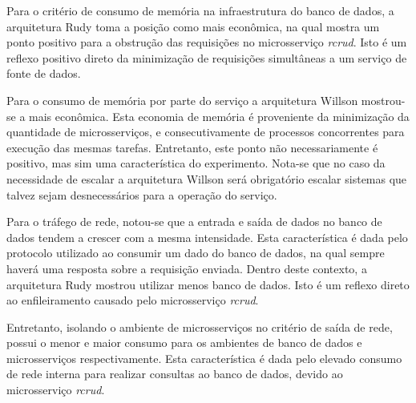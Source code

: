 Para o critério de consumo de memória na infraestrutura do banco de dados, a arquitetura Rudy toma a posição como mais econômica, na qual mostra um ponto positivo para a obstrução das requisições no microsserviço \textit{rcrud}.
%
Isto é um reflexo positivo direto da minimização de requisições simultâneas a um serviço de fonte de dados.


Para o consumo de memória por parte do serviço a arquitetura Willson mostrou-se a mais econômica.
%
Esta economia de memória é proveniente da minimização da quantidade de microsserviços, e consecutivamente de processos concorrentes para execução das mesmas tarefas.
%
Entretanto, este ponto não necessariamente é positivo, mas sim uma característica do experimento.
Nota-se que no caso da necessidade de escalar a arquitetura Willson será obrigatório escalar sistemas que talvez sejam desnecessários para a operação do serviço.

Para o tráfego de rede, notou-se que a entrada e saída de dados no banco de dados tendem a crescer com a mesma intensidade.
%
Esta característica é dada pelo protocolo utilizado ao consumir um dado do banco de dados, na qual sempre haverá uma resposta sobre a requisição enviada.
%
Dentro deste contexto, a arquitetura Rudy mostrou utilizar menos banco de dados.
%
Isto é um reflexo direto ao enfileiramento causado pelo microsserviço \textit{rcrud}.

Entretanto, isolando o ambiente de microsserviços no critério de saída de rede, possui o menor e maior consumo para os ambientes de banco de dados e microsserviços respectivamente.
%
Esta característica é dada pelo elevado consumo de rede interna para realizar consultas ao banco de dados, devido ao microsserviço \textit{rcrud}.

